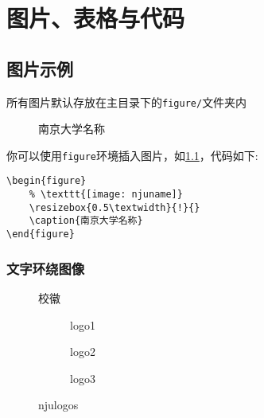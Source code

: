 \chapter{图片、表格与代码}

\section{图片示例}

所有图片默认存放在主目录下的\texttt{figure/}文件夹内

\begin{figure}[htbp]
    \resizebox{0.5\textwidth}{!}{}
    \caption{南京大学名称}
    \label{fig:njuname}
\end{figure}
你可以使用\lstinline|figure|环境插入图片，如\cref{fig:njuname}，代码如下:
\begin{lstlisting}[style=LaTeX]
\begin{figure}
    % \texttt{[image: njuname]}
    \resizebox{0.5\textwidth}{!}{}
    \caption{南京大学名称}
\end{figure}
\end{lstlisting}

\subsection{文字环绕图像}
\begin{wrapfigure}{r}{0cm}
    \resizebox{.15\textwidth}{!}{}
    \caption{校徽}
\end{wrapfigure}
\zhlipsum[3][name=xiangyu]

\begin{figure}[htbp]
    \begin{subfigure}{.32\textwidth}
        \centering
        \resizebox{\textwidth}{!}{} 
        \caption{logo1}
    \end{subfigure}
    \begin{subfigure}{.32\textwidth}
        \centering
        \resizebox{\textwidth}{!}{} 
        \caption{logo2}
    \end{subfigure}
    \begin{subfigure}{.32\textwidth}
        \centering
        \resizebox{\textwidth}{!}{} 
        \caption{logo3}
    \end{subfigure}
    \caption{njulogos}
\end{figure}
    


